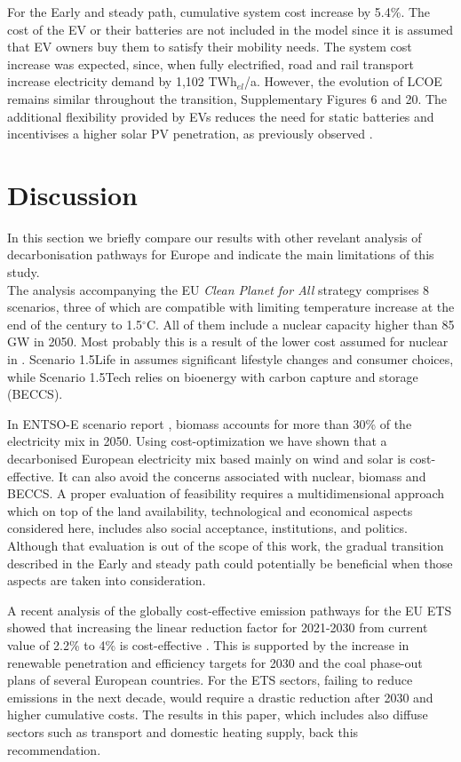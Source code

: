 \documentclass[5p]{elsarticle} %
\begin{document}
For the Early and steady path, cumulative system cost increase by 5.4\%. The cost of the EV or their batteries are not included in the model since it is assumed that EV owners buy them to satisfy their mobility needs. The system cost increase was expected, since, when fully electrified, road and rail transport increase electricity demand by 1,102 TWh$_{el}$/a. However, the evolution of LCOE remains similar throughout the transition, Supplementary Figures 6 and 20. The additional flexibility provided by EVs reduces the need for static batteries and incentivises a higher solar PV penetration, as previously observed \cite{Brown_2018, Victoria_2019_storage}.

\section{Discussion}

In this section we briefly compare our results with other revelant analysis of decarbonisation pathways for Europe and indicate the main limitations of this study. \\

The analysis accompanying the EU \textit{Clean Planet for All} strategy \cite{in-depth_2018} comprises 8 scenarios, three of which are compatible with limiting temperature increase at the end of the century to 1.5$^{\circ}$C. All of them include a nuclear capacity higher than 85 GW in 2050. Most probably this is a result of the lower cost assumed for nuclear in \cite{in-depth_2018}. Scenario 1.5Life in \cite{in-depth_2018} assumes significant lifestyle changes and consumer choices, while Scenario 1.5Tech relies on bioenergy with carbon capture and storage (BECCS). 

In ENTSO-E scenario report \cite{TYNDP_scenarios}, biomass accounts for more than 30\% of the electricity mix in 2050. Using cost-optimization we have shown that a decarbonised European electricity mix based mainly on wind and solar is cost-effective.  It can also avoid the concerns associated with nuclear, biomass and BECCS. A proper evaluation of feasibility requires a multidimensional approach which on top of the land availability, technological and economical aspects considered here, includes also social acceptance, institutions, and politics. Although that evaluation is out of the scope of this work, the gradual transition described in the Early and steady path could potentially be beneficial when those aspects are taken into consideration. 

A recent analysis of the globally cost-effective emission pathways for the EU ETS showed that increasing the linear reduction factor for 2021-2030 from current value of 2.2\% to 4\% is cost-effective \cite{Zaklan_2020}. This is supported by the increase in renewable penetration and efficiency targets for 2030 and the coal phase-out plans of several European countries. For the ETS sectors, failing to reduce emissions in the next decade, would require a drastic reduction after 2030 and higher cumulative costs. The results in this paper, which includes also diffuse sectors such as transport and domestic heating supply, back this recommendation. 
\end{document}
